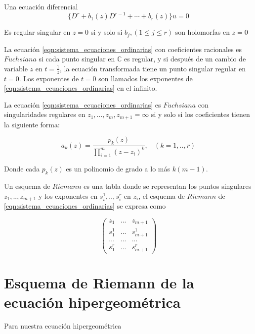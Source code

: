 \begin{lem} Una ecuaci\'on diferencial
$$ \lbrace D^{r} + b_{1}(z)D^{r-1} + \cdots + b_{r}(z)  \rbrace u =0$$

Es regular singular en $z=0$ si y solo si $b_{j}, (1 \leq j \leq r)$ son holomorfas en $z=0$
\end{lem}

La ecuaci\'on \ref{eqn:sistema_ecuaciones_ordinarias} con coeficientes racionales es $Fuchsiana$ si cada punto singular en ${\mathbb{C}}$ es regular, y si despu\'es de un cambio de variable $z$ en $t=\frac{1}{z}$, la ecuaci\'on transformada tiene un punto singular regular en $t=0$. Los exponentes de $t=0$ son llamados los exponentes de \ref{eqn:sistema_ecuaciones_ordinarias} en el infinito.

\begin{prop}
La ecuaci\'on \ref{eqn:sistema_ecuaciones_ordinarias} es $Fuchsiana$ con singularidades regulares en $z_{1},...,z_{m},z_{m+1} = \infty $ si y solo si los coeficientes tienen la siguiente forma:

$$ a_{k}(z) = \frac{p_{k}(z)}{\prod^{m}_{i=1}  (z-z_{i})^{k}}, \ \ \ \ (k=1,..,r)$$

Donde cada $p_{k}(z)$ es un polinomio de grado a lo m\'as $k(m-1)$.
\end{prop}

\begin{defn} Un esquema de $Riemann$ es una tabla donde se representan los puntos singulares $z_{1},..,z_{m+1}$ y los exponentes en $s_{i}^{1},..,s_{i}^{r}$ en $z_{i}$, el esquema de $Riemann$ de \ref{eqn:sistema_ecuaciones_ordinarias} se expresa como



\[ \left( \begin{array}{ccc}
z_{1} & ... & z_{m+1} \\
s_{1}^{1} & ... & s_{m+1}^{1} \\
... & ... & ... \\
s_{1}^{r} & ... & s_{m+1}^{r} \end{array} \right)\]

\end{defn}

\section{Esquema de Riemann de la ecuaci\'on hipergeom\'etrica}

Para nuestra ecuaci\'on hipergeom\'etrica

